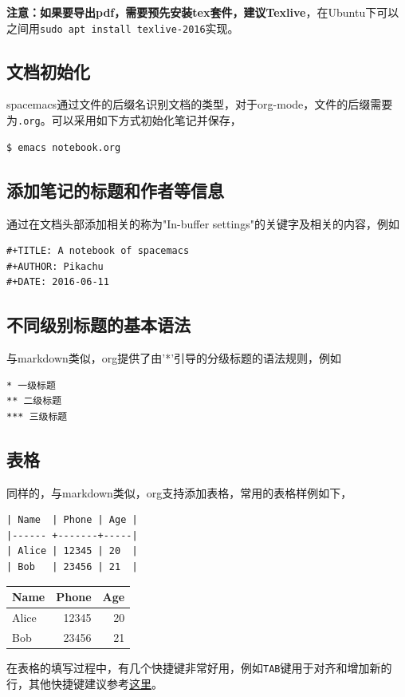 \documentclass[11pt]{article}
\begin{document}
\textbf{注意：如果要导出pdf，需要预先安装tex套件，建议Texlive}，在Ubuntu下可以之间用\texttt{sudo apt install texlive-2016}实现。

\subsection{文档初始化}
\label{sec:org60ce166}
spacemacs通过文件的后缀名识别文档的类型，对于org-mode，文件的后缀需要为\texttt{.org}。可以采用如下方式初始化笔记并保存，
\begin{center}
\begin{verbatim}
$ emacs notebook.org
\end{verbatim}
\end{center}

\subsection{添加笔记的标题和作者等信息}
\label{sec:org8404f6a}
通过在文档头部添加相关的称为"In-buffer settings"的关键字及相关的内容，例如
\begin{verbatim}
#+TITLE: A notebook of spacemacs
#+AUTHOR: Pikachu
#+DATE: 2016-06-11
\end{verbatim}

\subsection{不同级别标题的基本语法}
\label{sec:org35e2345}
与markdown类似，org提供了由'*'引导的分级标题的语法规则，例如
\begin{verbatim}
* 一级标题
** 二级标题
*** 三级标题
\end{verbatim}
\subsection{表格}
\label{sec:orga9628c3}
同样的，与markdown类似，org支持添加表格，常用的表格样例如下，
\begin{center}
\begin{verbatim}
| Name  | Phone | Age |
|------ +-------+-----|
| Alice | 12345 | 20  |
| Bob   | 23456 | 21  |
\end{verbatim}
\end{center}

\begin{center}
\begin{tabular}{lrr}
Name & Phone & Age\\
\hline
Alice & 12345 & 20\\
Bob & 23456 & 21\\
\end{tabular}
\end{center}
在表格的填写过程中，有几个快捷键非常好用，例如\texttt{TAB}键用于对齐和增加新的行，其他快捷键建议参考\href{https://www.cnblogs.com/Open\_Source/archive/2011/07/17/2108747.html\#sec-3}{这里}。
\end{document}
